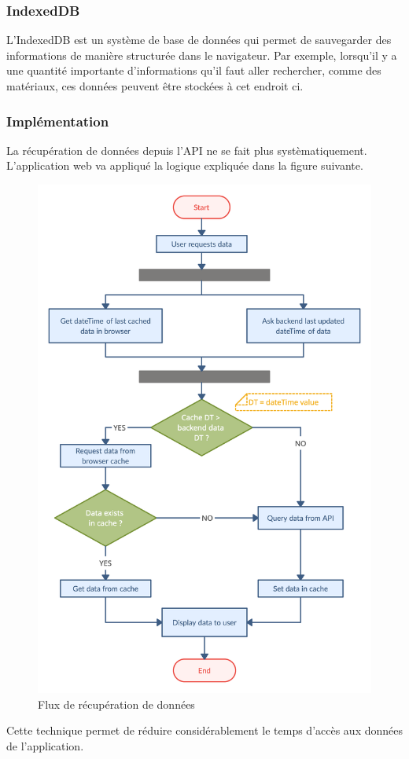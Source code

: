 \subsubsection{IndexedDB}
L'IndexedDB est un système de base de données qui permet de sauvegarder des informations de manière structurée dans le navigateur. Par exemple, lorsqu'il y a une quantité importante d'informations qu'il faut aller rechercher, comme des matériaux, ces données peuvent être stockées à cet endroit ci.
\newpage
\subsubsection{Implémentation}
La récupération de données depuis l'API ne se fait plus systèmatiquement. L'application web va appliqué la logique expliquée dans la figure suivante.
\begin{figure}[H]
  \centering
  \includegraphics[scale=0.3]{img/flowchartFrontend.png}
  \caption{Flux de récupération de données}
  \label{Flux de recuperation}
\end{figure}
Cette technique permet de réduire considérablement le temps d'accès aux données de l'application.
